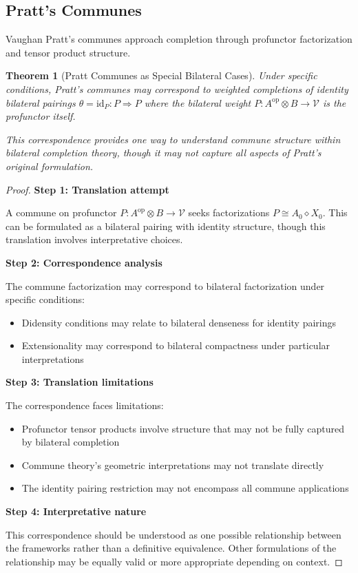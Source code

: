 \documentclass[11pt]{article}
\theoremstyle{plain}
\newtheorem{theorem}{Theorem}[section]
\theoremstyle{definition}
\theoremstyle{remark}
\newcommand{\V}{\mathcal{V}}
\newcommand{\op}{\mathrm{op}}
\begin{document}
\subsection{Pratt's Communes}

Vaughan Pratt's communes \cite{pratt2010communes} approach completion through profunctor factorization and tensor product structure.

\begin{theorem}[Pratt Communes as Special Bilateral Cases]\label{thm:pratt-correspondence}
Under specific conditions, Pratt's communes may correspond to weighted completions of identity bilateral pairings $\theta = \text{id}_P : P \Rightarrow P$ where the bilateral weight $P : A^{\op} \otimes B \to \V$ is the profunctor itself.

This correspondence provides one way to understand commune structure within bilateral completion theory, though it may not capture all aspects of Pratt's original formulation.
\end{theorem}

\begin{proof}
\textbf{Step 1: Translation attempt}

A commune on profunctor $P : A^{\op} \otimes B \to \V$ seeks factorizations $P \cong A_0 \diamond X_0$. This can be formulated as a bilateral pairing with identity structure, though this translation involves interpretative choices.

\textbf{Step 2: Correspondence analysis}

The commune factorization may correspond to bilateral factorization under specific conditions:
\begin{itemize}
\item Didensity conditions may relate to bilateral denseness for identity pairings
\item Extensionality may correspond to bilateral compactness under particular interpretations
\end{itemize}

\textbf{Step 3: Translation limitations}

The correspondence faces limitations:
\begin{itemize}
\item Profunctor tensor products involve structure that may not be fully captured by bilateral completion
\item Commune theory's geometric interpretations may not translate directly
\item The identity pairing restriction may not encompass all commune applications
\end{itemize}

\textbf{Step 4: Interpretative nature}

This correspondence should be understood as one possible relationship between the frameworks rather than a definitive equivalence. Other formulations of the relationship may be equally valid or more appropriate depending on context.
\end{proof}
\end{document}
